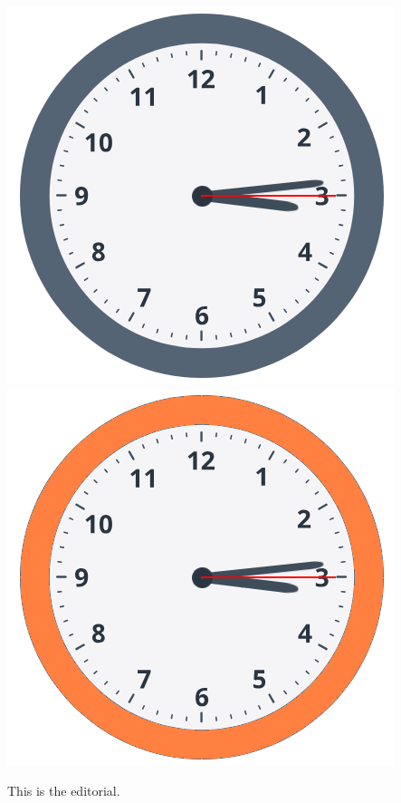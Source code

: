 \includegraphics[scale=0.5]{relogio1.png}
\includegraphics[scale=0.5]{relogio2.png}

This is the editorial.
